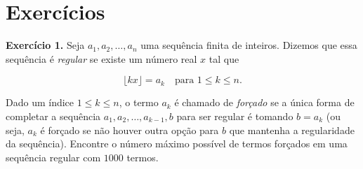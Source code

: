 \documentclass{hipatia}
\theoremstyle{definition} %
\begin{document}



\section{Exercícios}

\noindent\textbf{Exercício 1.}
Seja $a_1, a_2, \ldots, a_n$ uma sequência finita de inteiros. Dizemos que essa sequência é \textit{regular} se existe um número real $x$ tal que

$$\lfloor kx \rfloor = a_k \quad \text{para } 1 \leq k \leq n.$$

\noindent Dado um índice $1 \leq k \leq n$, o termo $a_k$ é chamado de \textit{forçado} se a única forma de completar a sequência $a_1, a_2, \ldots, a_{k-1}, b$ para ser regular é tomando $b = a_k$ (ou seja, $a_k$ é forçado se não houver outra opção para $b$ que mantenha a regularidade da sequência). Encontre o número máximo possível de termos forçados em uma sequência regular com $1000$ termos.\vspace{0.2cm}




\end{document}
